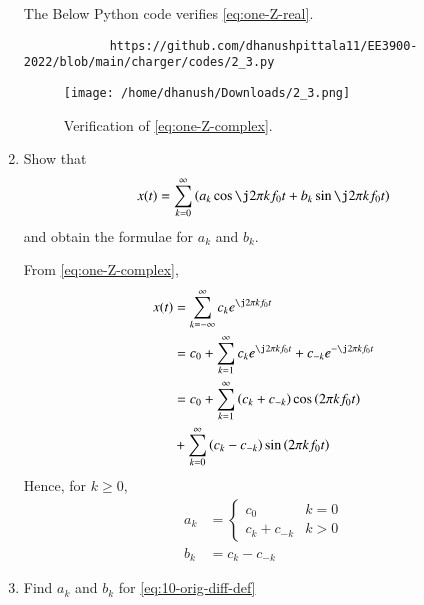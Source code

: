 \documentclass[journal,12pt,twocolumn]{IEEEtran}
\renewcommand\thesection{\arabic{section}}
\begin{document}
\begin{enumerate}[label=\thesection.\arabic*,ref=\thesection.\theenumi]
		\solution The Below Python code verifies \eqref{eq:one-Z-real}.
		\begin{lstlisting}
			https://github.com/dhanushpittala11/EE3900-2022/blob/main/charger/codes/2_3.py
		\end{lstlisting}
		
		\begin{figure}[!ht]
			\texttt{[image: /home/dhanush/Downloads/2\_3.png]}
			\caption{Verification of \eqref{eq:one-Z-complex}.}
			\label{fig:ver-complex}
		\end{figure}
		
		\item Show that 
		\begin{align}
			x(t) = \sum_{k = 0}^{\infty}\brak{a_k\cos{\j2\pi kf_0 t}+b_k\sin{\j2\pi kf_0 t}}
			\label{eq:one-Z-real}
		\end{align}
		and obtain the formulae for $a_k$ and $b_k$.
		
		\solution From \eqref{eq:one-Z-complex},
		\begin{align}
			x(t) &= \sum_{k = -\infty}^{\infty}c_ke^{\j2\pi kf_0 t} \\
			&= c_0 + \sum_{k = 1}^{\infty}c_ke^{\j2\pi kf_0t} + c_{-k}e^{-\j2\pi kf_0t} \\
			&= c_0 + \sum_{k = 1}^{\infty}\brak{c_k + c_{-k}}\cos\brak{2\pi kf_0t}  \nonumber \\
			&+ \sum_{k = 0}^{\infty}\brak{c_k - c_{-k}}\sin\brak{2\pi kf_0t}
		\end{align}
		Hence, for $k \ge 0$,
		\begin{align}
			a_k &= 
			\begin{cases}
				c_0 & k = 0 \\
				c_k + c_{-k} & k > 0
			\end{cases} \label{eq:ak} \\
			b_k &= c_k - c_{-k}
			\label{eq:bk}
		\end{align}
		\item Find $a_k$ and $b_k$ for 
		\eqref{eq:10-orig-diff-def}
		

\end{enumerate}
\end{document}
